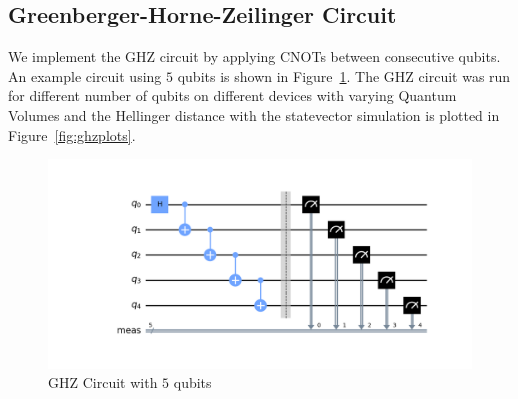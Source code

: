 \documentclass[11pt]{article}
\begin{document}
\subsection{Greenberger-Horne-Zeilinger Circuit}\label{ghz}
We implement the GHZ circuit by applying CNOTs between consecutive qubits. An example circuit using $5$ qubits is shown in Figure~\ref{fig:ghz}. The GHZ circuit was run for different number of qubits on different devices with varying Quantum Volumes and the Hellinger distance with the statevector simulation is plotted in Figure~\ref{fig:ghzplots}.
\begin{figure}[hbtp]
    \centering
    \includegraphics[width=0.75\linewidth]{outputs/ghz.png}
    \caption{GHZ Circuit with $5$ qubits}
    \label{fig:ghz}
\end{figure}
\end{document}
